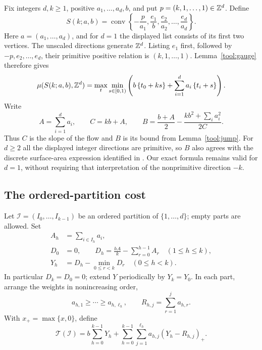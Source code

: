 \documentclass[11pt,a4paper]{article}
\theoremstyle{remark}\newtheorem{remark}[theorem]{Remark}
\DeclareMathOperator{\conv}{conv}
\newcommand{\fr}[1]{\left\{#1\right\}}\newcommand{\one}{\mathbf1}
\begin{document}
Fix integers $d,k\ge1$, positive $a_1,\ldots,a_d,b$, and put
$p=(k,1,\ldots,1)\in\mathbb Z^d$.  Define
\begin{equation}\label{part:simplex}
 S(k;a,b)=\conv\left\{-\frac{p}{a_1},\frac{e_1}{b},
              \frac{e_2}{a_2},\ldots,\frac{e_d}{a_d}\right\}.
\end{equation}
Here $a=(a_1,\ldots,a_d)$, and for $d=1$ the displayed list consists
of its first two vertices.  The unscaled directions generate
$\mathbb Z^d$.  Listing $e_1$ first, followed by $-p,e_2,\ldots,e_d$,
their primitive positive relation is $(k,1,\ldots,1)$.
Lemma~\ref{tool:gauge} therefore gives
\begin{equation}\label{part:gauge}
 \mu(S(k;a,b),\Z^d)
 =\max_t\min_{s\in[0,1)}
 \left(b\fr{t_0+ks}+\sum_{i=1}^d a_i\fr{t_i+s}\right).
\end{equation}
Write
\begin{equation}\label{part:constants}
 A=\sum_{i=1}^d a_i,\qquad C=kb+A,\qquad
 B=\frac{b+A}{2}-\frac{kb^2+\sum_i a_i^2}{2C}.
\end{equation}
Thus $C$ is the slope of the flow and $B$ is its bound from
Lemma~\ref{tool:jump}.  For $d\ge2$ all the displayed integer
directions are primitive, so $B$ also agrees with the discrete
surface-area expression identified in \cite{VMRC200}.  Our exact
formula remains valid for $d=1$, without requiring that interpretation
of the nonprimitive direction $-k$.

\subsection{The ordered-partition cost}

Let $\mathcal I=(I_0,\ldots,I_{k-1})$ be an ordered partition of
$\{1,\ldots,d\}$; empty parts are allowed.  Set
\begin{align}
 A_h&=\sum_{i\in I_h}a_i,\nonumber\\
 D_0&=0,\qquad
 D_h=\frac{hA}{k}-\sum_{r=0}^{h-1}A_r\quad(1\le h\le k),
       \label{part:levels}\\
 Y_h&=D_h-\min_{0\le r<k}D_r\quad(0\le h<k).\nonumber
\end{align}
In particular $D_k=D_0=0$; extend $Y$ periodically by $Y_k=Y_0$.
In each part, arrange the weights in nonincreasing order,
\[
 a_{h,1}\ge\cdots\ge a_{h,\ell_h},\qquad
 R_{h,j}=\sum_{r=1}^j a_{h,r}.
\]
With $x_+=\max\{x,0\}$, define
\begin{equation}\label{part:cost}
 \mathcal T(\mathcal I)
 =b\sum_{h=0}^{k-1}Y_h
  +\sum_{h=0}^{k-1}\sum_{j=1}^{\ell_h}
        a_{h,j}(Y_h-R_{h,j})_+.
\end{equation}
\end{document}
